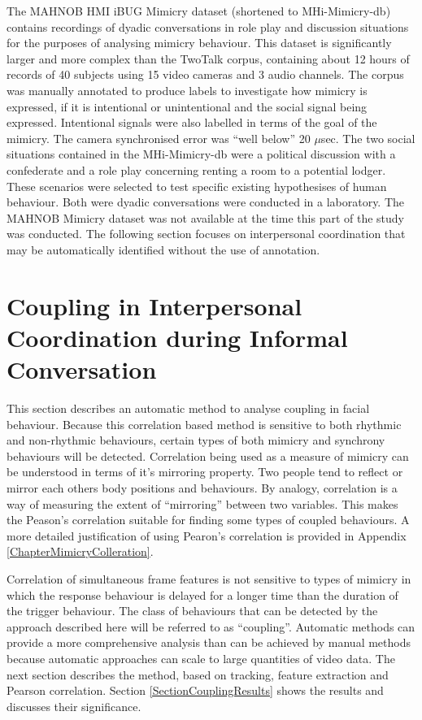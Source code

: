 The MAHNOB HMI iBUG Mimicry dataset (shortened to MHi-Mimicry-db) \cite{Sun2011} contains recordings of dyadic conversations in role play and discussion situations for the purposes of analysing mimicry behaviour. This dataset is significantly larger and more complex than the TwoTalk corpus, containing about 12 hours of records of 40 subjects using 15 video cameras and 3 audio channels. The corpus was manually annotated to produce labels to investigate how mimicry is expressed, if it is intentional or unintentional and the social signal being expressed. Intentional signals were also labelled in terms of the goal of the mimicry. The camera synchronised error was ``well below'' 20 $\mu$sec. The two social situations contained in the MHi-Mimicry-db were a political discussion with a confederate and a role play concerning renting a room to a potential lodger. These scenarios were selected to test specific existing hypothesises of human behaviour. Both were dyadic conversations were conducted in a laboratory. The MAHNOB Mimicry dataset was not available at the time this part of the study was conducted. The following section focuses on interpersonal coordination that may be automatically identified without the use of annotation.

\section{Coupling in Interpersonal Coordination during Informal Conversation}
\label{SectionMirrorBehaviour}

This section describes an automatic method to analyse coupling in facial behaviour. Because this correlation based method is sensitive to both rhythmic and non-rhythmic behaviours, certain types of both mimicry and synchrony behaviours will be detected. Correlation being used as a measure of mimicry can be understood in terms of it's mirroring property. Two people tend to reflect or mirror each others body positions and behaviours. By analogy, correlation is a way of measuring the  extent of ``mirroring'' between two variables. This makes the Peason's correlation suitable for finding some types of coupled behaviours. A more detailed justification of using Pearon's correlation is provided in Appendix \ref{ChapterMimicryColleration}.

Correlation of simultaneous frame features is not sensitive to types of mimicry in which the response behaviour is delayed for a longer time than the duration of the trigger behaviour. The class of behaviours that can be detected by the approach described here will be referred to as ``coupling''. Automatic methods can provide a more comprehensive analysis than can be achieved by manual methods because automatic approaches can scale to large quantities of video data.
The next section describes the method, based on tracking, feature extraction and Pearson correlation. Section \ref{SectionCouplingResults} shows the results and discusses their significance.


